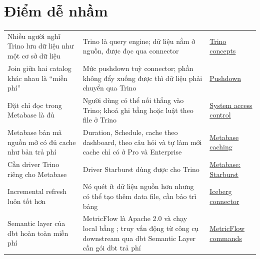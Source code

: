\section{Điểm dễ nhầm}
\begin{xltabular}{\textwidth}{@{}P{4.0cm} L P{3.2cm}@{}}
\toprule
{} &  &  \\
\midrule
\endhead
\bottomrule
\endfoot
Nhiều người nghĩ Trino lưu dữ liệu như một cơ sở dữ liệu & Trino là query engine; dữ liệu nằm ở nguồn, được đọc qua connector & \href{https://trino.io/docs/current/overview/concepts.html}{Trino concepts} \\
Join giữa hai catalog khác nhau là ``miễn phí'' & Mức pushdown tuỳ connector; phần không đẩy xuống được thì dữ liệu phải chuyển qua Trino & \href{https://trino.io/docs/current/optimizer/pushdown.html}{Pushdown} \\
Đặt chỉ đọc trong Metabase là đủ & Người dùng có thể nối thẳng vào Trino; khoá ghi bằng  hoặc luật theo file ở Trino & \href{https://trino.io/docs/current/security/built-in-system-access-control.html}{System access control} \\
Metabase bản mã nguồn mở có đủ cache như bản trả phí & Duration, Schedule, cache theo dashboard, theo câu hỏi và tự làm mới cache chỉ có ở Pro và Enterprise & \href{https://www.metabase.com/docs/latest/configuring-metabase/caching}{Metabase caching} \\
Cần driver Trino riêng cho Metabase & Driver Starburst dùng được cho Trino & \href{https://www.metabase.com/docs/latest/databases/connections/starburst}{Metabase: Starburst} \\
Incremental refresh luôn tốt hơn & Nó quét ít dữ liệu nguồn hơn nhưng có thể tạo thêm data file, cần bảo trì bảng & \href{https://trino.io/docs/current/connector/iceberg.html}{Iceberg connector} \\
Semantic layer của dbt hoàn toàn miễn phí & MetricFlow là Apache 2.0 và chạy local bằng ; truy vấn động từ công cụ downstream qua dbt Semantic Layer cần gói dbt trả phí & \href{https://docs.getdbt.com/docs/build/metricflow-commands}{MetricFlow commands} \\
\end{xltabular}
